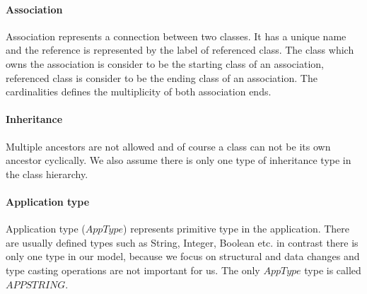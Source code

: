 \documentclass[runningheads]{comsis}
\begin{document}
\paragraph{Association} Association represents a connection between two classes. It has a unique name and the reference is represented by the label of referenced class. The class which owns the association is consider to be the starting class of an association, referenced class is consider to be the ending class of an association. The cardinalities defines the multiplicity of both association ends.

\paragraph{Inheritance} 
Multiple ancestors are not allowed and of course a class can not be its own ancestor cyclically. We also assume there is only one type of inheritance type in the class hierarchy.

\paragraph{Application type} Application type ($AppType$) represents primitive type in the application. There are usually defined types such as String, Integer, Boolean etc. in contrast there is only one type in our model, because we focus on structural and data changes and type casting operations are not important for us. The only $AppType$ type is called $APPSTRING$.
\end{document}
